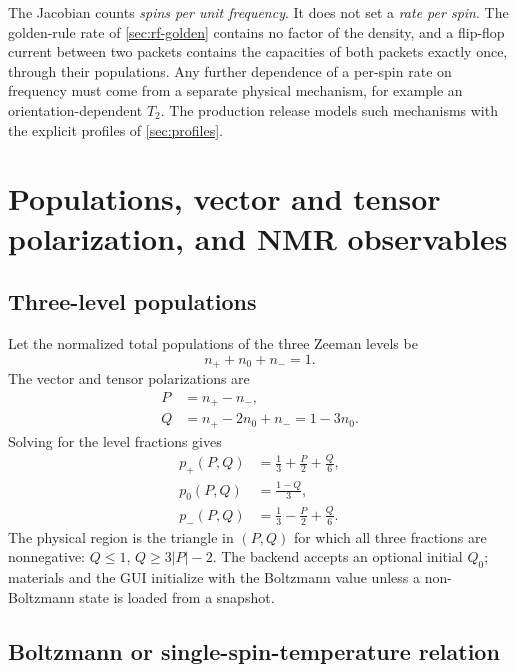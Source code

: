 \documentclass[11pt]{article}
\begin{document}
The Jacobian counts \emph{spins per unit frequency}. It does not set a \emph{rate per spin}. The
golden-rule rate of \cref{sec:rf-golden} contains no factor of the density, and a flip-flop
current between two packets contains the capacities of both packets exactly once, through their
populations. Any further dependence of a per-spin rate on frequency must come from a separate
physical mechanism, for example an orientation-dependent \(T_2\). The production release models
such mechanisms with the explicit profiles of \cref{sec:profiles}.

\section{Populations, vector and tensor polarization, and NMR observables}
\label{sec:observables}

\subsection{Three-level populations}

Let the normalized total populations of the three Zeeman levels be
\begin{equation}
  n_{+}+n_{0}+n_{-}=1.
\end{equation}
The vector and tensor polarizations are
\begin{align}
  P &= n_{+}-n_{-},
  \label{eq:Pdef}\\
  Q &= n_{+}-2n_{0}+n_{-}=1-3n_{0}.
  \label{eq:Qdef}
\end{align}
Solving for the level fractions gives
\begin{align}
  p_{+}(P,Q) &= \frac13+\frac{P}{2}+\frac{Q}{6},
  \label{eq:pplus}\\
  p_{0}(P,Q) &= \frac{1-Q}{3},
  \label{eq:pzero}\\
  p_{-}(P,Q) &= \frac13-\frac{P}{2}+\frac{Q}{6}.
  \label{eq:pminus}
\end{align}
The physical region is the triangle in \((P,Q)\) for which all three fractions are nonnegative:
\(Q\le1\), \(Q\ge 3|P|-2\). The backend accepts an optional initial \(Q_0\); materials and the
GUI initialize with the Boltzmann value unless a non-Boltzmann state is loaded from a snapshot.

\subsection{Boltzmann or single-spin-temperature relation}
\end{document}
